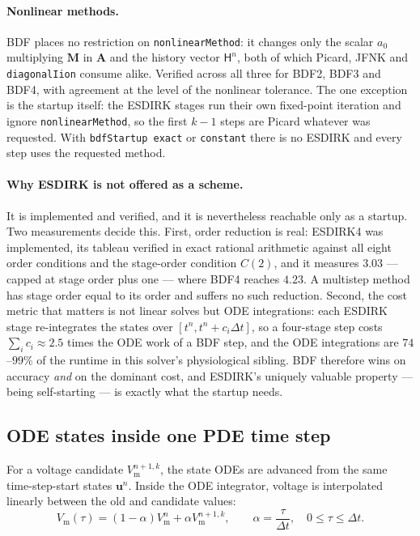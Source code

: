 \documentclass[11pt,a4paper]{article}
\newcommand{\code}[1]{\texttt{\small #1}}
\newcommand{\Vm}{V_{\text{m}}}
\newcommand{\Mmass}{\mathbf{M}}
\newcommand{\Aimp}{\mathbf{A}}
\begin{document}
\paragraph{Nonlinear methods.} BDF places no restriction on
\code{nonlinearMethod}: it changes only the scalar $a_0$ multiplying $\Mmass$ in
$\Aimp$ and the history vector $\mathsf{H}^n$, both of which Picard, JFNK and
\code{diagonalIion} consume alike. Verified across all three for BDF2, BDF3 and
BDF4, with agreement at the level of the nonlinear tolerance. The one exception
is the startup itself: the ESDIRK stages run their own fixed-point iteration and
ignore \code{nonlinearMethod}, so the first $k-1$ steps are Picard whatever was
requested. With \code{bdfStartup exact} or \code{constant} there is no ESDIRK and
every step uses the requested method.

\paragraph{Why ESDIRK is not offered as a scheme.} It is implemented and
verified, and it is nevertheless reachable only as a startup. Two measurements
decide this. First, order reduction is real: ESDIRK4 was implemented, its
tableau verified in exact rational arithmetic against all eight order
conditions and the stage-order condition $C(2)$, and it measures $3.03$ ---
capped at stage order plus one --- where BDF4 reaches $4.23$. A multistep method
has stage order equal to its order and suffers no such reduction. Second, the
cost metric that matters is not linear solves but ODE integrations: each ESDIRK
stage re-integrates the states over $[t^n,t^n+c_i\Delta t]$, so a four-stage
step costs $\sum_i c_i\approx2.5$ times the ODE work of a BDF step, and the ODE
integrations are $74$--$99\%$ of the runtime in this solver's physiological
sibling. BDF therefore wins on accuracy \emph{and} on the dominant cost, and
ESDIRK's uniquely valuable property --- being self-starting --- is exactly what
the startup needs.

\subsection{ODE states inside one PDE time step}

For a voltage candidate $\Vm^{n+1,k}$, the state ODEs are advanced from the
same time-step-start states $\mathbf{u}^n$. Inside the ODE integrator, voltage
is interpolated linearly between the old and candidate values:
\begin{equation}
  \Vm(\tau)
  =
  (1-\alpha)\Vm^n+\alpha \Vm^{n+1,k},
  \qquad
  \alpha=\frac{\tau}{\Delta t},\quad 0\le \tau\le \Delta t.
  \label{eq:ode-vm-interpolation}
\end{equation}
\end{document}

